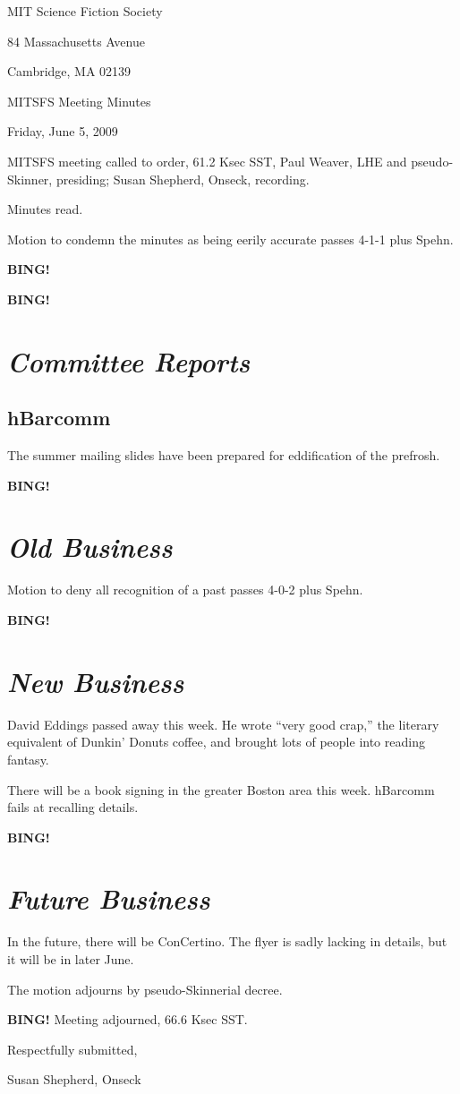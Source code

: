 \documentclass[10pt]{article}
\newcommand{\bing}{{\bf BING!} }
\newcommand{\goto}[1]{\bing \vskip 12pt \section*{{\em{#1}}}}
\newcommand{\ps}{ plus Spehn\xspace}
\begin{document}
\begin{center}

MIT Science Fiction Society

84 Massachusetts Avenue

Cambridge, MA 02139

\vspace{12pt}

MITSFS Meeting Minutes

Friday, June 5, 2009

\end{center}

\vspace{18pt}

\setlength{\parskip}{6pt}

\noindent
MITSFS meeting called to order, 61.2 Ksec SST,
Paul Weaver, LHE and pseudo-Skinner, presiding; Susan Shepherd, Onseck, recording.

Minutes read.

Motion to condemn the minutes as being eerily accurate passes 4-1-1\ps.

\bing

\goto{Committee Reports}

\subsection*{hBarcomm}
The summer mailing slides have been prepared for eddification of the prefrosh.

\goto{Old Business}

Motion to deny all recognition of a past passes 4-0-2\ps.

\goto{New Business}

David Eddings passed away this week. He wrote ``very good crap,'' the literary equivalent of Dunkin' Donuts coffee, and brought lots of people into reading fantasy.

There will be a book signing in the greater Boston area this week. hBarcomm fails at recalling details.

\goto{Future Business}

In the future, there will be ConCertino. The flyer is sadly lacking in details, but it will be in later June.

The motion adjourns by pseudo-Skinnerial decree.

\bing
\noindent
Meeting adjourned, 66.6 Ksec SST.

\vspace{18pt}

\centerline{Respectfully submitted,}
\centerline{Susan Shepherd, Onseck}
\end{document}
